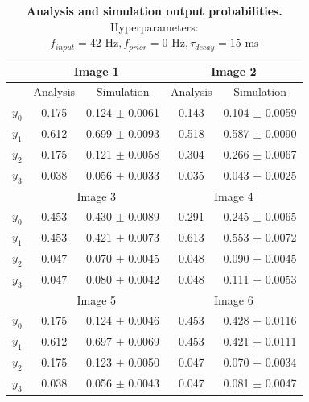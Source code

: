 \begin{table}[]
\centering
\label{tab:1D_42_0_15}
\small
\tabcolsep=0.11cm
\begin{tabular}{|c|cc|cc|}
\hline
                       & \multicolumn{2}{c|}{Image 1}                       & \multicolumn{2}{c|}{Image 2}                       \\ \hline
                       & \multicolumn{1}{c|}{Analysis} & Simulation         & \multicolumn{1}{c|}{Analysis} & Simulation         \\ \hline
$y_0$                  & \multicolumn{1}{c|}{0.175}    & 0.124 $\pm$ 0.0061 & \multicolumn{1}{c|}{0.143}    & 0.104 $\pm$ 0.0059 \\ \hline
$y_1$                  & \multicolumn{1}{c|}{0.612}    & 0.699 $\pm$ 0.0093 & \multicolumn{1}{c|}{0.518}    & 0.587 $\pm$ 0.0090 \\ \hline
$y_2$                  & \multicolumn{1}{c|}{0.175}    & 0.121 $\pm$ 0.0058 & \multicolumn{1}{c|}{0.304}    & 0.266 $\pm$ 0.0067 \\ \hline
$y_3$                  & \multicolumn{1}{c|}{0.038}    & 0.056 $\pm$ 0.0033 & \multicolumn{1}{c|}{0.035}    & 0.043 $\pm$ 0.0025 \\ \hline
                       & \multicolumn{2}{c|}{Image 3}                       & \multicolumn{2}{c|}{Image 4}                       \\ \hline
$y_0$                  & \multicolumn{1}{c|}{0.453}    & 0.430 $\pm$ 0.0089 & \multicolumn{1}{c|}{0.291}    & 0.245 $\pm$ 0.0065 \\ \hline
$y_1$                  & \multicolumn{1}{c|}{0.453}    & 0.421 $\pm$ 0.0073 & \multicolumn{1}{c|}{0.613}    & 0.553 $\pm$ 0.0072 \\ \hline
$y_2$                  & \multicolumn{1}{c|}{0.047}    & 0.070 $\pm$ 0.0045 & \multicolumn{1}{c|}{0.048}    & 0.090 $\pm$ 0.0045 \\ \hline
$y_3$                  & \multicolumn{1}{c|}{0.047}    & 0.080 $\pm$ 0.0042 & \multicolumn{1}{c|}{0.048}    & 0.111 $\pm$ 0.0053 \\ \hline
						& \multicolumn{2}{c|}{Image 5}                       & \multicolumn{2}{c|}{Image 6}                       \\ \hline
$y_0$                  & \multicolumn{1}{c|}{0.175}    & 0.124 $\pm$ 0.0046 & \multicolumn{1}{c|}{0.453}    & 0.428 $\pm$ 0.0116 \\ \hline
$y_1$                  & \multicolumn{1}{c|}{0.612}    & 0.697 $\pm$ 0.0069 & \multicolumn{1}{c|}{0.453}    & 0.421 $\pm$ 0.0111 \\ \hline
$y_2$                  & \multicolumn{1}{c|}{0.175}    & 0.123 $\pm$ 0.0050 & \multicolumn{1}{c|}{0.047}    & 0.070 $\pm$ 0.0034 \\ \hline
$y_3$                  & \multicolumn{1}{c|}{0.038}    & 0.056 $\pm$ 0.0043 & \multicolumn{1}{c|}{0.047}    & 0.081 $\pm$ 0.0047 \\ \hline
\end{tabular}
\caption{\textbf{Analysis and simulation output probabilities. } Hyperparameters: $f_{input} = 42\text{ Hz}, f_{prior} = 0\text{ Hz}, \tau_{decay} = 15\text{ ms}$}
\end{table}

